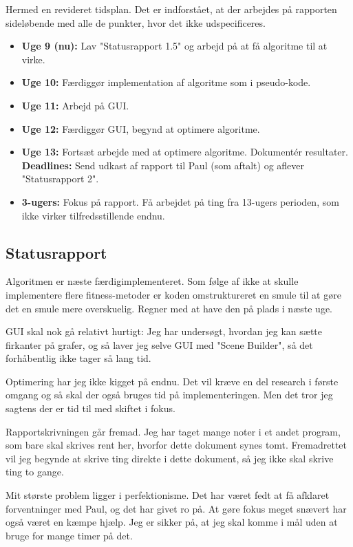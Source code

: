 Hermed en revideret tidsplan. Det er indforstået, at der arbejdes på rapporten
sideløbende med alle de punkter, hvor det ikke udspecificeres. 

\begin{itemize}
    \item \textbf{Uge 9 (nu):} Lav "Statusrapport 1.5" og arbejd på at få
    algoritme til at virke. 
    \item \textbf{Uge 10:} Færdiggør implementation af algoritme som i
    pseudo-kode. 
    \item \textbf{Uge 11:} Arbejd på GUI. 
    \item \textbf{Uge 12:} Færdiggør GUI, begynd at optimere algoritme. 
    \item \textbf{Uge 13:} Fortsæt arbejde med at optimere algoritme. Dokumentér
    resultater. \textbf{Deadlines:} Send udkast af rapport til Paul (som aftalt) 
    og aflever "Statusrapport 2". 
    \item \textbf{3-ugers:} Fokus på rapport. Få arbejdet på ting fra 13-ugers
    perioden, som ikke virker tilfredsstillende endnu. 
\end{itemize}

\subsection{Statusrapport}

Algoritmen er næste færdigimplementeret. Som følge af ikke at skulle
implementere flere fitness-metoder er koden omstruktureret en smule til at gøre
det en smule mere overskuelig. Regner med at have den på plads i næste uge. 

GUI skal nok gå relativt hurtigt: Jeg har undersøgt, hvordan jeg kan sætte
firkanter på grafer, og så laver jeg selve GUI med "Scene Builder", så det
forhåbentlig ikke tager så lang tid. 

Optimering har jeg ikke kigget på endnu. Det vil kræve en del research i første
omgang og så skal der også bruges tid på implementeringen. Men det tror jeg
sagtens der er tid til med skiftet i fokus. 

Rapportskrivningen går fremad. Jeg har taget mange noter i et andet program, som
bare skal skrives rent her, hvorfor dette dokument synes tomt. Fremadrettet vil
jeg begynde at skrive ting direkte i dette dokument, så jeg ikke skal skrive
ting to gange. 

Mit største problem ligger i perfektionisme. Det har været fedt at få afklaret
forventninger med Paul, og det har givet ro på. At gøre fokus meget snævert har
også været en kæmpe hjælp. Jeg er sikker på, at jeg skal komme i mål uden at
bruge for mange timer på det. 

\newpage 